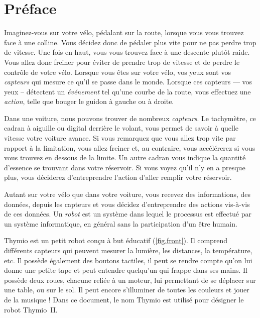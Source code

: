 \chapter*{Préface}


Imaginez-vous sur votre vélo, pédalant sur la route, lorsque vous vous trouvez face à une colline.
Vous décidez donc de pédaler plus vite pour ne pas perdre trop de vitesse.
Une fois en haut, vous vous trouvez face à une descente plutôt raide.
Vous allez donc freiner pour éviter de prendre trop de vitesse et de perdre le contrôle de votre vélo.
Lorsque vous êtes sur votre vélo, vos yeux sont vos \textit{capteurs} qui mesure ce qu'il se passe dans le monde.
Lorsque ces capteurs --- vos yeux -- détectent un \textit{événement} tel qu'une courbe de la route, vous effectuez une \textit{action}, telle que bouger le guidon à gauche ou à droite.

Dans une voiture, nous pouvons trouver de nombreux \textit{capteurs}.
Le tachymètre, ce cadran à aiguille ou digital derrière le volant, vous permet de savoir à quelle vitesse votre voiture avance.
Si vous remarquez que vous allez trop vite par rapport à la limitation, vous allez freiner et, au contraire, vous accélérerez si vous vous trouvez en dessous de la limite.
Un autre cadran vous indique la quantité d'essence se trouvant dans votre réservoir.
Si vous voyez qu'il n'y en a presque plus, vous déciderez d'entreprendre l'action d'aller remplir votre réservoir.
 
Autant sur votre vélo que dans votre voiture, vous recevez des informations, des données, depuis les capteurs et vous décidez d'entreprendre des actions vis-à-vis de ces données. Un \textit{robot} est un système dans lequel le processus est effectué par un système informatique, en général sans la participation d'un être humain.


Thymio est un petit robot conçu à but éducatif (\cref{fig.front}).
Il comprend différents capteurs qui peuvent mesurer la lumière, les distances, la température, etc.
Il possède également des boutons tactiles, il peut se rendre compte qu'on lui donne une petite tape et peut entendre quelqu'un qui frappe dans ses mains.
Il possède deux roues, chacune reliée à un moteur, lui permettant de se déplacer sur une table, ou sur le sol.
Il peut encore s'illuminer de toutes les couleurs et jouer de la musique !
Dans ce document, le nom Thymio est utilisé pour désigner le robot Thymio~II.

